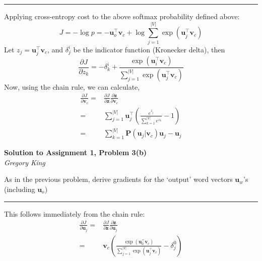 \documentclass[letter,12pt]{article}
\newcommand{\myhwtitle}[3]
{\begin{center}
{\large {\bf Solution to Assignment {#1}, Problem {#2}}}\\
\medskip
{\it {#3}} %
\end{center}}
\newcommand{\solutionsAuthor}{Gregory King}
\begin{document}
\noindent\rule{\textwidth}{0.4pt}\vspace{5mm}
Applying cross-entropy cost to the above softmax probability defined above:
\begin{equation}
J =-\log{p} = - {\boldsymbol u}_{o}^{\top}{\boldsymbol v}_{c} + \log\sum^{\vert{V}\vert}_{j=1}\exp{({\boldsymbol u}_{j}^{\top}{\boldsymbol v}_{c})}
\end{equation}
Let $z_{j}={\boldsymbol u}_{j}^{\top}{\boldsymbol v}_{c}$, and $\delta^{i}_{j}$ be the indicator function (Kronecker delta), then
\begin{equation}
\frac{\partial J}{\partial{z_{k}}} = - \delta^{i}_{k} + \frac{\exp{({\boldsymbol u}_{i}^{\top}{\boldsymbol v}_{c})}}{\sum^{\vert{V}\vert}_{j=1}\exp{({\boldsymbol u}_{j}^{\top}{\boldsymbol v}_{c})}}
\end{equation}
Now, using the chain rule, we can calculate,
\begin{align}
\frac{\partial J}{\partial{{\boldsymbol v}_{c}}} =& \frac{\partial J}{\partial{{\boldsymbol z}}}\frac{\partial{{\boldsymbol z}}}{\partial{{\boldsymbol v}_{c}}} \\
                                                                    =& \sum^{\vert{V}\vert}_{j=1}{\boldsymbol u}_{j}^{\top}\left(\frac{e^{z_{j}}}{\sum^{\vert{V}\vert}_{k=1}e^{z_{k}}} -  1\right) \\
                                                                    =& \sum^{\vert{V}\vert}_{k=1}{\boldsymbol P}({\boldsymbol u}_{j} \vert {\boldsymbol v}_{c} ){\boldsymbol u}_{j} - {\boldsymbol u}_{j}
\end{align}

\clearpage

\myhwtitle{1}{3(b)}{\solutionsAuthor}

\bigskip
\noindent As in the previous problem, derive gradients for the `output' word vectors ${\boldsymbol u}_{w}$'s (including ${\boldsymbol u}_{o}$)\vspace{5mm}
\noindent\rule{\textwidth}{0.4pt}\vspace{5mm}
This follows immediately from the chain rule:
\begin{align}
\frac{\partial J}{\partial{\boldsymbol u}_{j}} = &\frac{\partial J}{\partial{{\boldsymbol z}}}\frac{\partial{{\boldsymbol z}}}{\partial{\boldsymbol u}_{j}} \\
                                                                  = &{\boldsymbol v}_{c}\left(\frac{\exp{({\boldsymbol u}^{\top}_{0}{\boldsymbol v}_{c})}}{\sum^{\vert{V}\vert}_{j=1}\exp{({\boldsymbol u}^{\top}_{j}{\boldsymbol v}_{c})}} - \delta^{0}_{j}\right)
\end{align}
\clearpage
\end{document}
